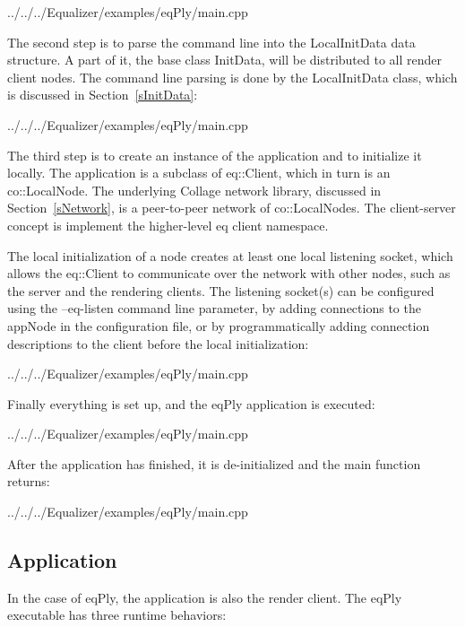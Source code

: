 \documentclass[10pt,a4]{scrartcl}
\newcommand{\sref}[1]{Section~\ref{#1}}
\begin{document}
{\footnotesize
  {../../../Equalizer/examples/eqPly/main.cpp}}

The second step is to parse the command line into the
\textsf{LocalInitData} data structure. A part of it, the base class
\textsf{InitData}, will be distributed to all render client nodes. The
command line parsing is done by the \textsf{LocalInitData} class, which
is discussed in \sref{sInitData}:

{\footnotesize
  {../../../Equalizer/examples/eqPly/main.cpp}}

The third step is to create an instance of the application and to initialize it
locally. The application is a subclass of \textsf{eq::Client}, which in turn is
an \textsf{co::LocalNode}. The underlying Collage network library, discussed in
\sref{sNetwork}, is a peer-to-peer network of \textsf{co::LocalNode}s. The
client-server concept is implement the higher-level \textsf{eq} client
namespace.

The local initialization of a node creates at least one local listening socket,
which allows the \textsf{eq::Client} to communicate over the network with other
nodes, such as the server and the rendering clients. The listening socket(s) can
be configured using the \textsf{--eq-listen} command line parameter, by adding
connections to the \textsf{appNode} in the configuration file, or by
programmatically adding connection descriptions to the client before the local
initialization:

{\footnotesize
  {../../../Equalizer/examples/eqPly/main.cpp}}

Finally everything is set up, and the \textsf{eqPly} application is executed:

{\footnotesize
  {../../../Equalizer/examples/eqPly/main.cpp}}

After the application has finished, it is de-initialized and the
\textsf{main} function returns:

{\footnotesize
  {../../../Equalizer/examples/eqPly/main.cpp}}

\subsection{Application}

In the case of \textsf{eqPly}, the application is also the render
client. The \textsf{eqPly} executable has three runtime behaviors:
\end{document}
